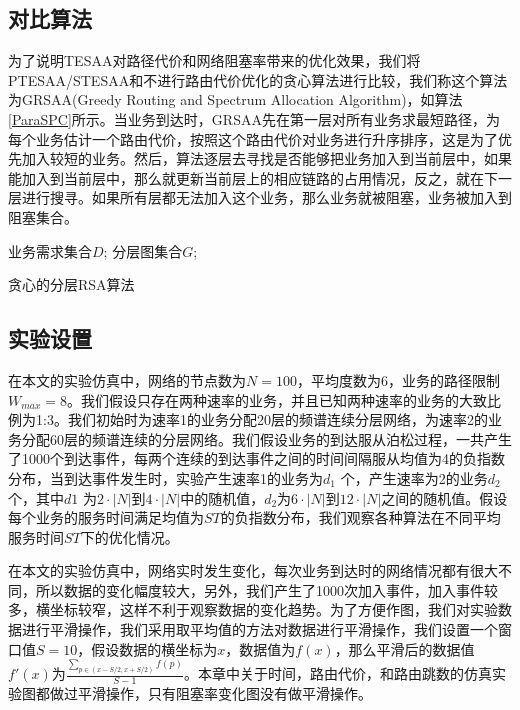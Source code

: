 \subsection{对比算法}
为了说明TESAA对路径代价和网络阻塞率带来的优化效果，我们将PTESAA/STESAA和不进行路由代价优化的贪心算法进行比较，我们称这个算法为GRSAA(Greedy Routing and Spectrum Allocation Algorithm)，如算法\ref{ParaSPC}所示。当业务到达时，GRSAA先在第一层对所有业务求最短路径，为每个业务估计一个路由代价，按照这个路由代价对业务进行升序排序，这是为了优先加入较短的业务。然后，算法逐层去寻找是否能够把业务加入到当前层中，如果能加入到当前层中，那么就更新当前层上的相应链路的占用情况，反之，就在下一层进行搜寻。如果所有层都无法加入这个业务，那么业务就被阻塞，业务被加入到阻塞集合。
\begin{algorithm}[t]
\begin{algorithmic}[1]
\Require
业务需求集合$D$;
分层图集合$G$;
\EndIf
\EndFor
{}
\EndIf
\EndFor
\EndFor
\EndFor
\end{algorithmic}
\caption{{贪心的分层RSA算法}}
\label{ParaSPC}
\end{algorithm}
\subsection{实验设置}
在本文的实验仿真中，网络的节点数为$N=100$，平均度数为$6$，业务的路径限制$W_{max}=8$。我们假设只存在两种速率的业务，并且已知两种速率的业务的大致比例为1:3。我们初始时为速率1的业务分配20层的频谱连续分层网络，为速率2的业务分配60层的频谱连续的分层网络。我们假设业务的到达服从泊松过程，一共产生了1000个到达事件，每两个连续的到达事件之间的时间间隔服从均值为4的负指数分布，当到达事件发生时，实验产生速率1的业务为$d_1$ 个，产生速率为2的业务$d_2$ 个，其中$d1$ 为$2 \cdot |N|$到$4 \cdot|N|$中的随机值，$d_2$为$6 \cdot |N|$到$12 \cdot |N|$之间的随机值。假设每个业务的服务时间满足均值为$ST$的负指数分布，我们观察各种算法在不同平均服务时间$ST$下的优化情况。

在本文的实验仿真中，网络实时发生变化，每次业务到达时的网络情况都有很大不同，所以数据的变化幅度较大，另外，我们产生了1000次加入事件，加入事件较多，横坐标较窄，这样不利于观察数据的变化趋势。为了方便作图，我们对实验数据进行平滑操作，我们采用取平均值的方法对数据进行平滑操作，我们设置一个窗口值$S=10$，假设数据的横坐标为$x$，数据值为$f(x)$，那么平滑后的数据值$f' \left( x \right)$为$\frac{\sum\limits_{p \in (x-S/2,x+S/2)}{f(p)}}{S-1}$。本章中关于时间，路由代价，和路由跳数的仿真实验图都做过平滑操作，只有阻塞率变化图没有做平滑操作。

